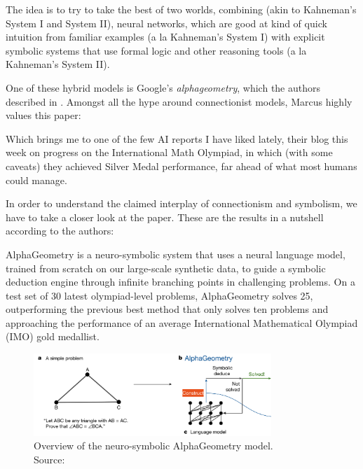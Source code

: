 \documentclass[../../main.tex]{subfiles}
\begin{document}
\begin{citecallout}
    The idea is to try to take the best of two worlds, combining (akin to Kahneman's System I and System II), neural networks, which are good at kind of quick intuition from familiar examples (a la Kahneman's System I) with explicit symbolic systems that use formal logic and other reasoning tools (a la Kahneman's System II).
\end{citecallout}

One of these hybrid models is Google's \emph{alphageometry}, which the authors described in . Amongst all the hype around connectionist models, Marcus highly values this paper:

\begin{citecallout}
    Which brings me to one of the few AI reports I have liked lately, their blog this week on progress on the International Math Olympiad, in which (with some caveats) they achieved Silver Medal performance, far ahead of what most humans could manage.
\end{citecallout}

In order to understand the claimed interplay of connectionism and symbolism, we have to take a closer look at the paper. These are the results in a nutshell according to the authors:

\begin{newcite}
    AlphaGeometry is a neuro-symbolic system that uses a neural language model,
    trained from scratch on our large-scale synthetic data, to guide a symbolic deduction
    engine through infinite branching points in challenging problems. On a test set of
    30 latest olympiad-level problems, AlphaGeometry solves 25, outperforming the
    previous best method that only solves ten problems and approaching the performance
    of an average International Mathematical Olympiad (IMO) gold medallist.
\end{newcite}

\begin{figure}[htbp]
    \centering
    \includegraphics[width=0.8\textwidth]{chapters/contemporary_research/alphageometry.png}
    \caption{Overview of the neuro-symbolic AlphaGeometry model. \\ Source: \textcite{Trinh2024}}
    \label{fig:alphageometry}
\end{figure}
\end{document}
